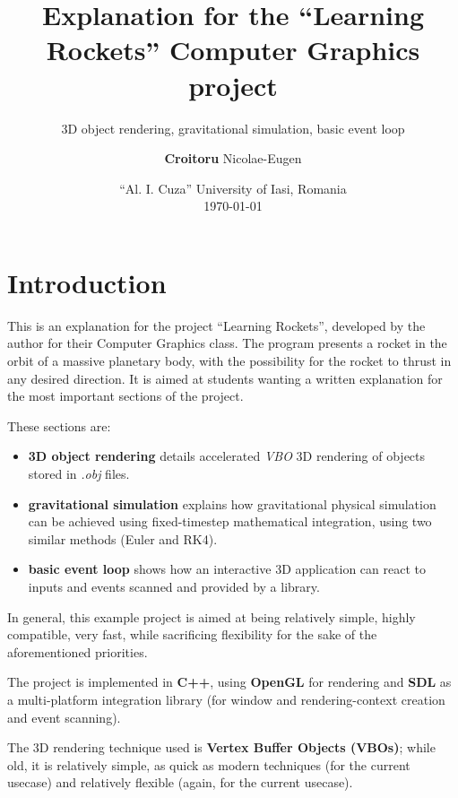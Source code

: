 \documentclass{scrartcl}
\begin{document}
\title{Explanation for the ``Learning Rockets'' Computer Graphics project}
\subtitle{3D object rendering, gravitational simulation, basic event loop}
\author{ \textbf{Croitoru} Nicolae-Eugen}
\date{%
  ``Al. I. Cuza'' University of Iasi, Romania\\[2ex]%
  \today
}
\maketitle

\section{Introduction}
This is an explanation for the project ``Learning Rockets'', developed by the author for their Computer Graphics class. The program presents a rocket in the orbit of a massive planetary body, with the possibility for the rocket to thrust in any desired direction. It is aimed at students wanting a written explanation for the most important sections of the project.

These sections are:
\begin{itemize}
\item{ \textbf{3D object rendering} } details accelerated \textit{VBO} 3D rendering of objects stored in \textit{.obj} files.
\item{ \textbf{gravitational simulation} } explains how gravitational physical simulation can be achieved using fixed-timestep mathematical integration, using two similar methods (Euler and RK4).
\item{ \textbf{basic event loop} } shows how an interactive 3D application can react to inputs and events scanned and provided by a library.
\end{itemize}

In general, this example project is aimed at being relatively simple, highly compatible, very fast, while sacrificing flexibility for the sake of the aforementioned priorities.

The project is implemented in \textbf{C++}, using \textbf{OpenGL} for rendering and \textbf{SDL} as a multi-platform integration library (for window and rendering-context creation and event scanning).

The 3D rendering technique used is \textbf{Vertex Buffer Objects (VBOs)}; while old, it is relatively simple, as quick as modern techniques (for the current usecase) and relatively flexible (again, for the current usecase).
\end{document}
